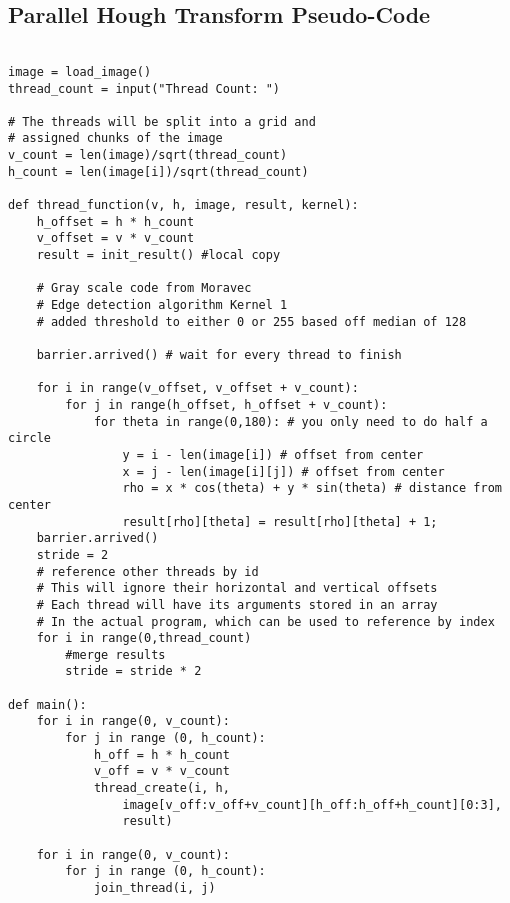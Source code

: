 \documentclass{article}
\begin{document}
        \subsection{Parallel Hough Transform Pseudo-Code}
        \begin{lstlisting}[basicstyle=\footnotesize]

image = load_image()
thread_count = input("Thread Count: ")

# The threads will be split into a grid and 
# assigned chunks of the image
v_count = len(image)/sqrt(thread_count)
h_count = len(image[i])/sqrt(thread_count)

def thread_function(v, h, image, result, kernel):
    h_offset = h * h_count
    v_offset = v * v_count
    result = init_result() #local copy
    
    # Gray scale code from Moravec
    # Edge detection algorithm Kernel 1
    # added threshold to either 0 or 255 based off median of 128
    
    barrier.arrived() # wait for every thread to finish
    
    for i in range(v_offset, v_offset + v_count):
        for j in range(h_offset, h_offset + v_count):
            for theta in range(0,180): # you only need to do half a circle
                y = i - len(image[i]) # offset from center
                x = j - len(image[i][j]) # offset from center
                rho = x * cos(theta) + y * sin(theta) # distance from center
                result[rho][theta] = result[rho][theta] + 1;
    barrier.arrived()
    stride = 2
    # reference other threads by id
    # This will ignore their horizontal and vertical offsets
    # Each thread will have its arguments stored in an array
    # In the actual program, which can be used to reference by index
    for i in range(0,thread_count)
        #merge results
        stride = stride * 2

def main():
    for i in range(0, v_count):
        for j in range (0, h_count):
            h_off = h * h_count
            v_off = v * v_count
            thread_create(i, h, 
                image[v_off:v_off+v_count][h_off:h_off+h_count][0:3], 
                result)
                
    for i in range(0, v_count):
        for j in range (0, h_count):
            join_thread(i, j)
        \end{lstlisting}
        \pagebreak       
        
\end{document}

